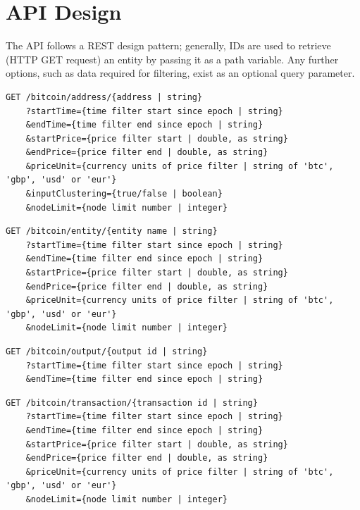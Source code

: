 \section{API Design}
The API follows a REST design pattern; generally, IDs are used to retrieve (HTTP GET request) an entity by passing it as a path variable. Any further options, such as data required for filtering, exist as an optional query parameter.  

\begin{lstlisting}[label={lst:address-api}, caption={Get an address using the unique full address. Several optional query parameters for filtering by time, price and enabling clustering and node limiting.}, breaklines=true, basicstyle=\small]
GET /bitcoin/address/{address | string}
    ?startTime={time filter start since epoch | string}
    &endTime={time filter end since epoch | string}
    &startPrice={price filter start | double, as string}
    &endPrice={price filter end | double, as string}
    &priceUnit={currency units of price filter | string of 'btc', 'gbp', 'usd' or 'eur'}
    &inputClustering={true/false | boolean}
    &nodeLimit={node limit number | integer}
\end{lstlisting}

\begin{lstlisting}[caption={Get an entity using the unique name of the entity . All query parameters are optional for filtering.}, breaklines=true, basicstyle=\small]
GET /bitcoin/entity/{entity name | string}
    ?startTime={time filter start since epoch | string}
    &endTime={time filter end since epoch | string}
    &startPrice={price filter start | double, as string}
    &endPrice={price filter end | double, as string}
    &priceUnit={currency units of price filter | string of 'btc', 'gbp', 'usd' or 'eur'}
    &nodeLimit={node limit number | integer}
\end{lstlisting}

\begin{lstlisting}[caption={Get an output with a unique output ID. All query parameters are optional for filtering.}, breaklines=true, basicstyle=\small]
GET /bitcoin/output/{output id | string}
    ?startTime={time filter start since epoch | string}
    &endTime={time filter end since epoch | string}
\end{lstlisting}

\begin{lstlisting}[caption={Get a transaction with a unique transaction ID (txid). All query parameters are optional for filtering.}, breaklines=true, basicstyle=\small]
GET /bitcoin/transaction/{transaction id | string}
    ?startTime={time filter start since epoch | string}
    &endTime={time filter end since epoch | string}
    &startPrice={price filter start | double, as string}
    &endPrice={price filter end | double, as string}
    &priceUnit={currency units of price filter | string of 'btc', 'gbp', 'usd' or 'eur'}
    &nodeLimit={node limit number | integer}
\end{lstlisting}

